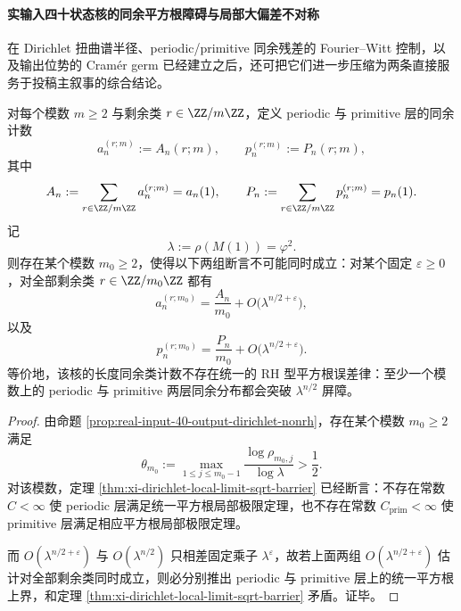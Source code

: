 \paragraph{实输入四十状态核的同余平方根障碍与局部大偏差不对称}
在 Dirichlet 扭曲谱半径、periodic/primitive 同余残差的 Fourier--Witt 控制，以及输出位势的 Cram\'er germ 已经建立之后，还可把它们进一步压缩为两条直接服务于投稿主叙事的综合结论。

\begin{theorem}[实输入四十状态核的长度同余分布不存在统一平方根障碍律]\label{thm:xi-real-input40-congruence-square-root-barrier-synthesis}
对每个模数 \(m\ge 2\) 与剩余类 \(r\in \ZZ/m\ZZ\)，定义 periodic 与 primitive 层的同余计数
\[
a_n^{(r;m)}:=A_n(r;m),
\qquad
p_n^{(r;m)}:=P_n(r;m),
\]
其中
\[
A_n:=\sum_{r\in\ZZ/m\ZZ}a_n^{(r;m)}=a_n(1),
\qquad
P_n:=\sum_{r\in\ZZ/m\ZZ}p_n^{(r;m)}=p_n(1).
\]
记
\[
\lambda:=\rho(M(1))=\varphi^2.
\]
则存在某个模数 \(m_0\ge 2\)，使得以下两组断言不可能同时成立：对某个固定 \(\varepsilon\ge 0\)，对全部剩余类 \(r\in\ZZ/m_0\ZZ\) 都有
\[
a_n^{(r;m_0)}
=
\frac{A_n}{m_0}
+O\!\bigl(\lambda^{n/2+\varepsilon}\bigr),
\]
以及
\[
p_n^{(r;m_0)}
=
\frac{P_n}{m_0}
+O\!\bigl(\lambda^{n/2+\varepsilon}\bigr).
\]
等价地，该核的长度同余类计数不存在统一的 RH 型平方根误差律：至少一个模数上的 periodic 与 primitive 两层同余分布都会突破 \(\lambda^{n/2}\) 屏障。
\end{theorem}
\begin{proof}
由命题 \ref{prop:real-input-40-output-dirichlet-nonrh}，存在某个模数 \(m_0\ge 2\) 满足
\[
\theta_{m_0}:=
\max_{1\le j\le m_0-1}\frac{\log \rho_{m_0,j}}{\log\lambda}
>
\frac12.
\]
对该模数，定理 \ref{thm:xi-dirichlet-local-limit-sqrt-barrier} 已经断言：不存在常数
\(
C<\infty
\)
使 periodic 层满足统一平方根局部极限定理，也不存在常数
\(
C_{\mathrm{prim}}<\infty
\)
使 primitive 层满足相应平方根局部极限定理。

而
\(
O(\lambda^{n/2+\varepsilon})
\)
与
\(
O(\lambda^{n/2})
\)
只相差固定乘子 \(\lambda^\varepsilon\)，故若上面两组 \(O(\lambda^{n/2+\varepsilon})\) 估计对全部剩余类同时成立，则必分别推出 periodic 与 primitive 层上的统一平方根上界，和定理 \ref{thm:xi-dirichlet-local-limit-sqrt-barrier} 矛盾。证毕。
\end{proof}

